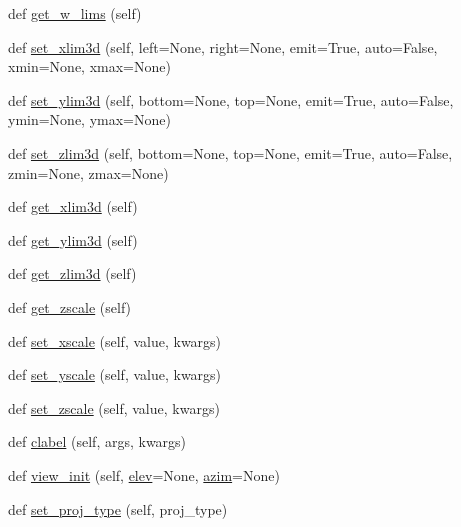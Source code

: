 \begin{DoxyCompactItemize}
\item 
def \hyperlink{classmplot3d_1_1axes3d_1_1Axes3D_a1615b0281495d39cb8635be9d074770e}{get\+\_\+w\+\_\+lims} (self)
\item 
def \hyperlink{classmplot3d_1_1axes3d_1_1Axes3D_a33829c4a728d5b958e0c10c680097627}{set\+\_\+xlim3d} (self, left=None, right=None, emit=True, auto=False, xmin=None, xmax=None)
\item 
def \hyperlink{classmplot3d_1_1axes3d_1_1Axes3D_a47e4806a72910ce25c0ce20446a123d1}{set\+\_\+ylim3d} (self, bottom=None, top=None, emit=True, auto=False, ymin=None, ymax=None)
\item 
def \hyperlink{classmplot3d_1_1axes3d_1_1Axes3D_a7b4e4084d78b3229ef62b93ccda7f6c5}{set\+\_\+zlim3d} (self, bottom=None, top=None, emit=True, auto=False, zmin=None, zmax=None)
\item 
def \hyperlink{classmplot3d_1_1axes3d_1_1Axes3D_a5ac81b0a692a1d5c52d56505f0e0771d}{get\+\_\+xlim3d} (self)
\item 
def \hyperlink{classmplot3d_1_1axes3d_1_1Axes3D_a868de9e872f745990756fbdd60680f0f}{get\+\_\+ylim3d} (self)
\item 
def \hyperlink{classmplot3d_1_1axes3d_1_1Axes3D_a23650e111f89635883df8adfbe7b5557}{get\+\_\+zlim3d} (self)
\item 
def \hyperlink{classmplot3d_1_1axes3d_1_1Axes3D_a0c6d8fc64e7941c89fcbee4ed92f1dd1}{get\+\_\+zscale} (self)
\item 
def \hyperlink{classmplot3d_1_1axes3d_1_1Axes3D_aea5939cbe30af95c2a5ed7b96cbad890}{set\+\_\+xscale} (self, value, kwargs)
\item 
def \hyperlink{classmplot3d_1_1axes3d_1_1Axes3D_ac6437da186e8ef40616693243f31c037}{set\+\_\+yscale} (self, value, kwargs)
\item 
def \hyperlink{classmplot3d_1_1axes3d_1_1Axes3D_af02b320cbdd5e0c613d5f768c42354ff}{set\+\_\+zscale} (self, value, kwargs)
\item 
def \hyperlink{classmplot3d_1_1axes3d_1_1Axes3D_a732e8201e873458dac2ae3b8a47aa81c}{clabel} (self, args, kwargs)
\item 
def \hyperlink{classmplot3d_1_1axes3d_1_1Axes3D_a329bd3a718c675e602416075e7994f98}{view\+\_\+init} (self, \hyperlink{classmplot3d_1_1axes3d_1_1Axes3D_ac4c7a5f33145517f85154fcba5f4410f}{elev}=None, \hyperlink{classmplot3d_1_1axes3d_1_1Axes3D_af9329eb594554894e36578f08fc5bd1c}{azim}=None)
\item 
def \hyperlink{classmplot3d_1_1axes3d_1_1Axes3D_a5c6865830a1e5dfa1957cab491569633}{set\+\_\+proj\+\_\+type} (self, proj\+\_\+type)

\end{DoxyCompactItemize}
